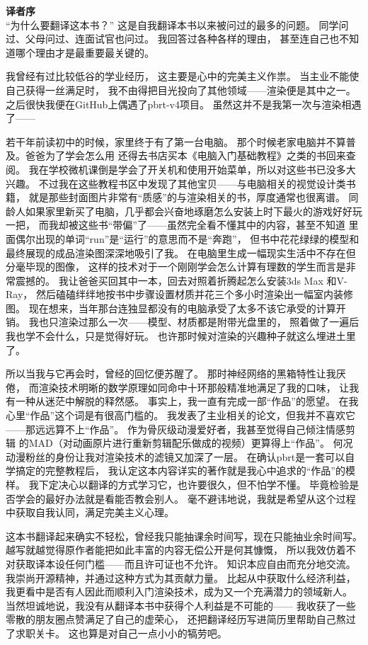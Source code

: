 {\Huge\bfseries 译者序}\vspace{30pt}\\

“为什么要翻译这本书？”
这是自我翻译本书以来被问过的最多的问题。
同学问过、父母问过、连面试官也问过。
我回答过各种各样的理由，
甚至连自己也不知道哪个理由才是最重要最关键的。

我曾经有过比较低谷的学业经历，
这主要是心中的完美主义作祟。
当主业不能使自己获得一丝满足时，
我不由得把目光投向了其他领域——渲染便是其中之一。
之后很快我便在GitHub上偶遇了pbrt-v4项目。
虽然这并不是我第一次与渲染相遇了——

若干年前读初中的时候，家里终于有了第一台电脑。
那个时候老家电脑并不算普及。爸爸为了学会怎么用
还得去书店买本《电脑入门基础教程》之类的书回来查阅。
我在学校微机课倒是学会了开关机和使用开始菜单，所以对这些书已没多大兴趣。
不过我在这些教程书区中发现了其他宝贝——与电脑相关的视觉设计类书籍，
就是那些封面图片非常有“质感”的与渲染相关的书，厚度通常也很离谱。
同龄人如果家里新买了电脑，几乎都会兴奋地琢磨怎么安装上时下最火的游戏好好玩一把，
而我却被这些书“带偏”了——虽然完全看不懂其中的内容，甚至不知道
里面偶尔出现的单词“run”是“运行”的意思而不是“奔跑”，
但书中花花绿绿的模型和最终展现的成品渲染图深深地吸引了我。
在电脑里生成一幅现实生活中不存在但分毫毕现的图像，
这样的技术对于一个刚刚学会怎么计算有理数的学生而言是非常震撼的。
我让爸爸买回其中一本，回去对照着折腾起怎么安装3ds Max\textsuperscript{\textregistered}
和V-Ray\textsuperscript{\textregistered}，
然后磕磕绊绊地按书中步骤设置材质并花三个多小时渲染出一幅室内装修图。
现在想来，当年那台连独显都没有的电脑承受了太多不该它承受的计算开销。
我也只渲染过那么一次——模型、材质都是附带光盘里的，
照着做了一遍后我也学不会什么，只是觉得好玩。
也许那时候对渲染的兴趣种子就这么埋进土里了。

所以当我与它再会时，曾经的回忆便苏醒了。
那时神经网络的黑箱特性让我厌倦，
而渲染技术明晰的数学原理如同命中十环那般精准地满足了我的口味，
让我有一种从迷茫中解脱的释然感。
事实上，我一直有完成一部“作品”的愿望。
在我心里“作品”这个词是有很高门槛的。
我发表了主业相关的论文，但我并不喜欢它——那远远算不上“作品”。
作为骨灰级动漫爱好者，我甚至觉得自己倾注情感剪辑
的MAD（对动画原片进行重新剪辑配乐做成的视频）更算得上“作品”。
何况动漫粉丝的身份让我对渲染技术的滤镜又加深了一层。
在确认pbrt是一套可以自学搞定的完整教程后，
我认定这本内容详实的著作就是我心中追求的“作品”的模样。
我下定决心以翻译的方式学习它，也许要很久，但不怕学不懂。
毕竟检验是否学会的最好办法就是看能否教会别人。
毫不避讳地说，我就是希望从这个过程中获取自我认同，满足完美主义心理。

这本书翻译起来确实不轻松，曾经我只能抽课余时间写，现在只能抽业余时间写。
越写就越觉得原作者能把如此丰富的内容无偿公开是何其慷慨，
所以我效仿着不对获取译本设任何门槛——而且许可证也不允许。
知识本应自由而充分地交流。我崇尚开源精神，并通过这种方式为其贡献力量。
比起从中获取什么经济利益，我更看中是否有人因此而顺利入门渲染技术，成为又一个充满潜力的领域新人。
当然坦诚地说，我没有从翻译本书中获得个人利益是不可能的——
我收获了一些零散的朋友圈点赞满足了自己的虚荣心，
还把翻译经历写进简历里帮助自己熬过了求职关卡。
这也算是对自己一点小小的犒劳吧。

